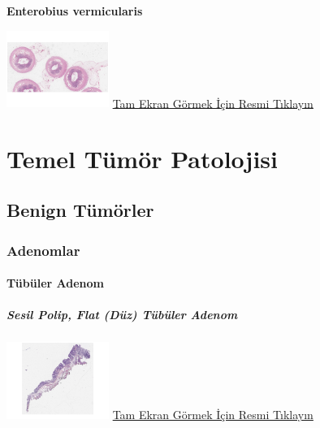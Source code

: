 \documentclass[
  letterpaper,
  DIV=11,
  numbers=noendperiod]{scrreprt}
\begin{document}
\textbf{Enterobius vermicularis}

\href{https://images.patolojiatlasi.com/enterobius-vermicularis/HE.html}{\includegraphics[width=0.25\textwidth,height=\textheight]{./screenshots/enterobius-vermicularis_screenshot.png}}
\href{https://images.patolojiatlasi.com/enterobius-vermicularis/HE.html}{Tam
Ekran Görmek İçin Resmi Tıklayın}

\part{Temel Tümör Patolojisi}

\hypertarget{sec-benign-tumorler}{%
\chapter{Benign Tümörler}\label{sec-benign-tumorler}}

\hypertarget{sec-adenomlar}{%
\section{Adenomlar}\label{sec-adenomlar}}

\hypertarget{sec-tubuler-adenom}{%
\subsection{Tübüler Adenom}\label{sec-tubuler-adenom}}

\hypertarget{sec-sesil-polip}{%
\subsubsection{Sesil Polip, Flat (Düz) Tübüler
Adenom}\label{sec-sesil-polip}}

\href{https://images.patolojiatlasi.com/tubularadenoma-flat/HE.html}{\includegraphics[width=0.25\textwidth,height=\textheight]{./screenshots/tubularadenoma-flat1_screenshot.png}}
\href{https://images.patolojiatlasi.com/tubularadenoma-flat/HE.html}{Tam
Ekran Görmek İçin Resmi Tıklayın}
\end{document}
